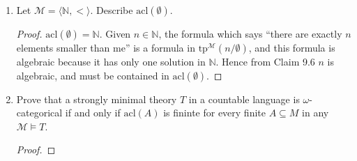 \documentclass{article}
\begin{document}
\begin{enumerate}[label={\bf Q\arabic*:}]
  \item Let $\mathcal{M}=\langle\mathbb{N},<\rangle$. Describe
    $\text{acl}(\emptyset)$.

    \begin{proof}
      $\text{acl}(\emptyset)=\mathbb{N}$. Given $n\in\mathbb{N}$, the
      formula which says ``there are exactly $n$ elements
      smaller than me'' is a formula in
      $\text{tp}^\mathcal{M}(n/\emptyset)$, and this formula is algebraic
      because it has only one solution in $\mathbb{N}$. Hence from Claim
      9.6 $n$ is algebraic, and must be contained in
      $\text{acl}(\emptyset)$.
    \end{proof}

  \item Prove that a strongly minimal theory $T$ in a countable language is
    $\omega$-categorical if and only if $\text{acl}(A)$ is fininte for
    every finite $A\subseteq M$ in any $\mathcal{M}\models T$. 

    \begin{proof}
    \end{proof}
\end{enumerate}
\end{document}
